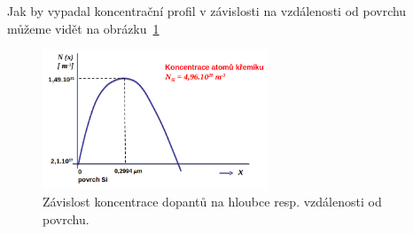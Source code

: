 Jak by vypadal koncentrační profil v závislosti na vzdálenosti od povrchu můžeme vidět na obrázku~\ref{fig:img-profil}

\begin{figure}[h!]
  \centering
  \includegraphics[width=0.6\textwidth]{img/profil.png}
  \caption{Závislost koncentrace dopantů na hloubce resp. vzdálenosti od povrchu.}
  \label{fig:img-profil}
\end{figure}

